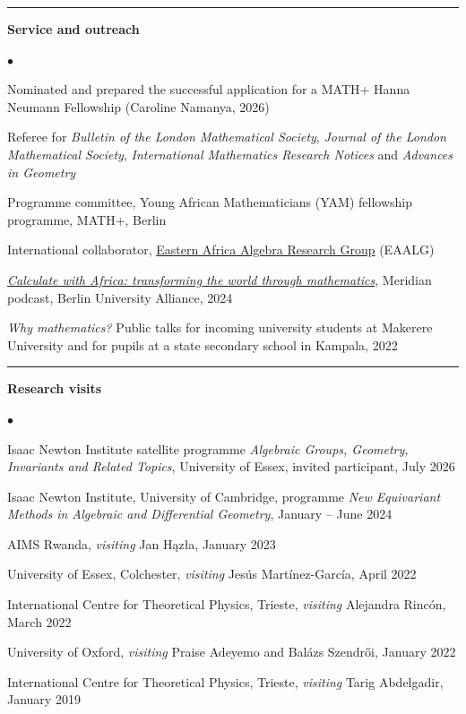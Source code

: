 \documentclass[10pt]{article}
\newcommand{\cvsection}[1]{%
  \par\vspace{0.24cm}%
  \noindent\rule{\textwidth}{0.4pt}%
  \par\vspace{0.12cm}%
  \noindent\textbf{\large #1}%
  \par\vspace{0.12cm}%
}
\newenvironment{cvlist}%
  {\begin{list}{$\bullet$}{%
     \setlength{\leftmargin}{1.1em}\setlength{\labelwidth}{0.8em}%
     \setlength{\itemsep}{0.12cm}\setlength{\parsep}{0pt}%
     \setlength{\topsep}{0pt}\setlength{\partopsep}{0pt}}}%
  {\end{list}}
\begin{document}
\cvsection{Service and outreach}
\begin{cvlist}
\item Nominated and prepared the successful application for a MATH+ Hanna
Neumann Fellowship (Caroline Namanya, 2026)
\item Referee for {\em Bulletin of the London Mathematical Society}, {\em Journal
of the London Mathematical Society}, {\em International Mathematics Research
Notices} and {\em Advances in Geometry}
\item Programme committee, Young African Mathematicians (YAM) fellowship
programme, MATH+, Berlin
\item International collaborator,
\href{https://sites.google.com/view/eaalg/international-collaborators}{Eastern Africa Algebra Research Group} (EAALG)
\item \href{https://mathplus.de/news/calculate-with-africa-meridian-podcast-featuring-math-members-bunnett-and-zainelabdeen/}{\em Calculate with Africa: transforming the world through mathematics},
Meridian podcast, Berlin University Alliance, 2024
\item {\em Why mathematics?} Public talks for incoming university students at
Makerere University and for pupils at a state secondary school in Kampala, 2022
\end{cvlist}

\cvsection{Research visits}
\begin{cvlist}
\item Isaac Newton Institute satellite programme
{\em Algebraic Groups, Geometry, Invariants and Related Topics},
University of Essex, invited participant, July 2026
\item Isaac Newton Institute, University of Cambridge, programme
{\em New Equivariant Methods in Algebraic and Differential Geometry},
January -- June 2024
\item AIMS Rwanda, {\em visiting} Jan H\k{a}z\l{}a, January 2023
\item University of Essex, Colchester, {\em visiting} Jes\'us Mart\'inez-Garc\'ia, April 2022
\item International Centre for Theoretical Physics, Trieste,
{\em visiting} Alejandra Rinc\'on, March 2022
\item University of Oxford, {\em visiting} Praise Adeyemo and Bal\'azs Szendr\H{o}i, January 2022
\item International Centre for Theoretical Physics, Trieste,
{\em visiting} Tarig Abdelgadir, January 2019
\end{cvlist}
\end{document}
